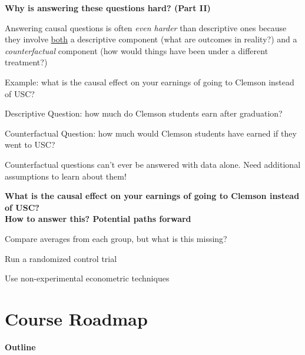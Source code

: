 \documentclass[11pt, aspectratio=169]{beamer}
\newenvironment{wideitemize}{\itemize\addtolength{\itemsep}{5pt}}{\enditemize}
\newenvironment{wideenumerate}{\enumerate\addtolength{\itemsep}{5pt}}{\endenumerate}
\begin{document}
\begin{frame}{\bf \large Why is answering these questions hard? (Part II)}
\begin{wideitemize}
	\item
	Answering causal questions is often \textit{even harder} than descriptive ones because they involve \underline{both} a descriptive component (what are outcomes in reality?) and a \textit{counterfactual} component (how would things have been under a different treatment?)
	
	\pause
	\item
	Example: what is the causal effect on your earnings of going to Clemson instead of USC? 
		\begin{wideitemize}
			\item
			Descriptive Question: how much do Clemson students earn after graduation? 
			
			\item
			Counterfactual Question: how much would Clemson students have earned if they went to USC?  
		\end{wideitemize}
		

	\item Counterfactual questions can't ever be answered with data alone. Need additional assumptions to learn about them!	
\end{wideitemize}	
\end{frame}


\begin{frame}[label=splitprob]{\bf \large What is the causal effect on your earnings of going to Clemson instead of USC? \\ {\normalsize How to answer this? Potential paths forward}}
\begin{wideenumerate}
	\item Compare averages from each group, but what is this missing?
	\item Run a randomized control trial
	\item Use non-experimental econometric techniques
\end{wideenumerate}

\hyperlink{framework}{}	
\end{frame}


\section{Course Roadmap}
	\begin{frame}{\bf \large Outline}
	\tableofcontents[currentsection]
\end{frame}
\end{document}
